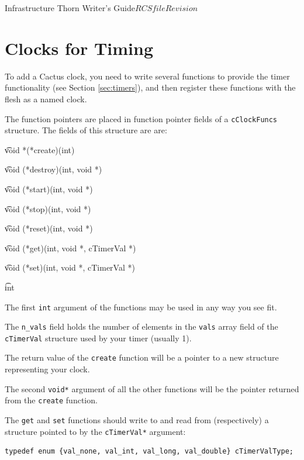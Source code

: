 \begin{cactuspart}{Infrastructure Thorn Writer's Guide}{$RCSfile$}{$Revision$}
\chapter{Clocks for Timing}
\label{chap:clocks}

To add a Cactus clock, you need to write several functions to provide the
timer functionality (see Section \ref{sec:timers}), and then register these
functions with the flesh as a named clock.

The function pointers are placed in function pointer fields of a 
\texttt{cClockFuncs} structure.  The fields of this structure are are:

\begin{Lentry}

\item[{\t create}] {\t void *(*create)(int)}
\item[{\t destroy}] {\t void (*destroy)(int, void *)}
\item[{\t start}] {\t void (*start)(int, void *)}
\item[{\t stop}] {\t void (*stop)(int, void *)}
\item[{\t reset}] {\t void (*reset)(int, void *)}
\item[{\t get}] {\t void (*get)(int, void *, cTimerVal *)}
\item[{\t set}] {\t void (*set)(int, void *, cTimerVal *)}
\item[{\t n\_vals}] {\t int}

\end{Lentry}

The first \texttt{int} argument of the functions may be used in any way
you see fit.

The \texttt{n\_vals} field holds the number of elements in the 
\texttt{vals} array field of the \texttt{cTimerVal} structure 
used by your timer (usually 1).

The return value of the \texttt{create} function will be a pointer to
a new structure representing your clock.

The second \texttt{void*} argument of all the other functions will be the
pointer returned from the \texttt{create} function.

The \texttt{get} and \texttt{set} functions should write to and read from
(respectively) a structure pointed to by the \texttt{cTimerVal*} argument:

\begin{verbatim}
typedef enum {val_none, val_int, val_long, val_double} cTimerValType;


\end{verbatim}
\end{cactuspart}

